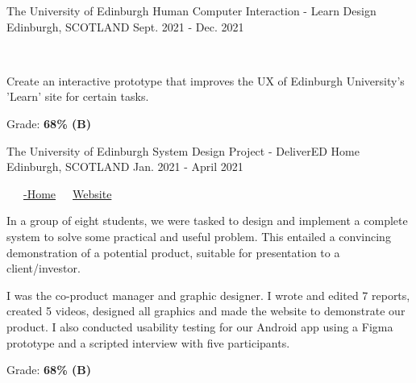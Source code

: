\begin{cventries}
  \cventry
    {The University of Edinburgh} %
    {Human Computer Interaction - Learn Design} %
    {Edinburgh, SCOTLAND} %
    {Sept. 2021 - Dec. 2021} %
    {
      \color{awesome}\color{graytext}\ \ \ \href{https://www.figma.com/proto/SEoaoC4LAWCmH1iGFA4AEO/G42-CW1?node-id=0\%3A1}{\faFigma\acvHeaderIconSep{}}\ \ \ \href{https://www.figma.com/proto/Q6wnTtZs5rP21QqnWcJBP6/G42-CW3?node-id=0\%3A1}{\faFigma\acvHeaderIconSep{}}
      \vspace{1.6em}
      \begin{cvitems} %
        \item Create an interactive prototype that improves the UX of Edinburgh University's 'Learn' site for certain tasks.
        \item Grade: \textbf{68\% (B)}
      \end{cvitems}
    }
    
  \cventry
    {The University of Edinburgh} %
    {System Design Project - DeliverED Home} %
    {Edinburgh, SCOTLAND} %
    {Jan. 2021 - April 2021} %
    {
      \color{awesome}     \color{graytext}\ \ \ \href{https://github.com/DeliverED-Home}{\faGithub\acvHeaderIconSep\@DeliverED-Home}\ \ \ \href{https://DeliverED-Home.github.io/DeliverED-Site}{\faGlobe\acvHeaderIconSep\@Product Website}
      \vspace{1.6em}
      \begin{cvitems} %
        \item In a group of eight students, we were tasked to design and implement a complete system to solve some practical and useful problem. This entailed a convincing demonstration of a potential product, suitable for presentation to a client/investor.
        \item I was the co-product manager and graphic designer. I wrote and edited 7 reports, created 5 videos, designed all graphics and made the website to demonstrate our product. I also conducted usability testing for our Android app using a Figma prototype and a scripted interview with five participants.
        \item Grade: \textbf{68\% (B)}
      \end{cvitems}
    }
    

\end{cventries}
